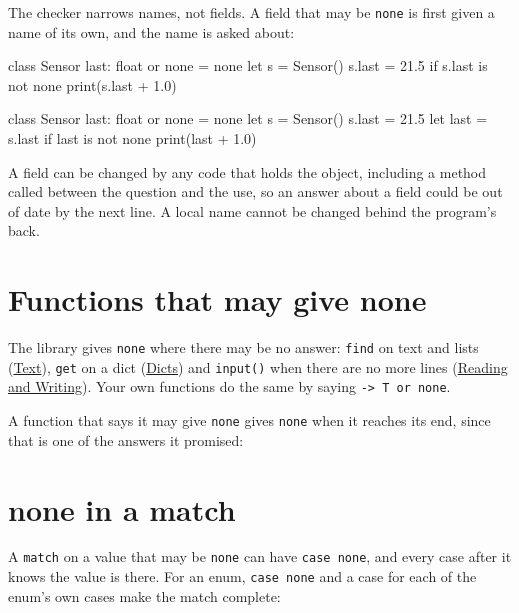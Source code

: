The checker narrows names, not fields. A field that may be \verb|none|
is first given a name of its own, and the name is asked about:

\begin{zeno}[fails=yes]
class Sensor {
    last: float or none = none
}
let s = Sensor()
s.last = 21.5
if s.last is not none {
    print(s.last + 1.0)
}
\end{zeno}

\begin{zeno}
class Sensor {
    last: float or none = none
}
let s = Sensor()
s.last = 21.5
let last = s.last
if last is not none {
    print(last + 1.0)
}
\end{zeno}

A field can be changed by any code that holds the object, including a
method called between the question and the use, so an answer about a
field could be out of date by the next line. A local name cannot be
changed behind the program's back.

\section{Functions that may give none}

The library gives \verb|none| where there may be no answer:
\verb|find| on text and lists (\hyperref[ch-text]{Text}),
\verb|get| on a dict (\hyperref[ch-dicts]{Dicts}) and \verb|input()|
when there are no more lines (\hyperref[ch-reading-writing]{Reading and
Writing}). Your own functions do the same by saying
\verb|-> T or none|.

A function that says it may give \verb|none| gives \verb|none| when it
reaches its end, since that is one of the answers it promised:


\section{none in a match}

A \verb|match| on a value that may be \verb|none| can have
\verb|case none|, and every case after it knows the value is there.
For an enum, \verb|case none| and a case for each of the enum's own
cases make the match complete:

